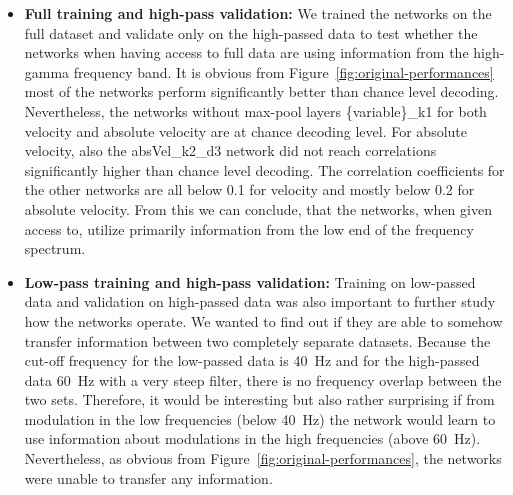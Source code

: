 \begin{itemize}
    \item \textbf{Full training and high-pass validation:} We trained the networks on the full dataset and validate only on the high-passed data to test whether the networks when having access to full data are using information from the high-gamma frequency band.
    It is obvious from Figure~\ref{fig:original-performances} most of the networks perform significantly better than chance level decoding.
    Nevertheless, the networks without max-pool layers \{variable\}\_k1 for both velocity and absolute velocity are at chance decoding level. For absolute velocity, also the absVel\_k2\_d3 network did not reach correlations significantly higher than chance level decoding. 
    The correlation coefficients for the other networks are all below 0.1 for velocity and mostly below 0.2 for absolute velocity.
    From this we can conclude, that the networks, when given access to, utilize primarily information from the low end of the frequency spectrum.
    \item \textbf{Low-pass training and high-pass validation:}
    Training on low-passed data and validation on high-passed data was also important to further study how the networks operate.
    We wanted to find out if they are able to somehow transfer information between two completely separate datasets.
    Because the cut-off frequency for the low-passed data is 40~Hz and for the high-passed data 60~Hz with a very steep filter, there is no frequency overlap between the two sets.
    Therefore, it would be interesting but also rather surprising if from modulation in the low frequencies (below 40~Hz) the network would learn to use information about modulations in the high frequencies (above 60~Hz).
    Nevertheless, as obvious from Figure~\ref{fig:original-performances}, the networks were unable to transfer any information.
    

\end{itemize}
